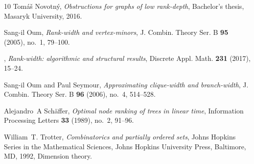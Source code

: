 \documentclass[11pt]{article}
\begin{document}
\begin{thebibliography}{10}
Tom{\'a}{\v{s}} Novotn{\'y}, \emph{Obstructions for graphs of low rank-depth},
  Bachelor’s thesis, Masaryk University, 2016.

Sang{-}il Oum, \emph{Rank-width and vertex-minors}, J. Combin. Theory Ser. B
  \textbf{95} (2005), no.~1, 79--100. 

\bysame, \emph{Rank-width: algorithmic and structural results}, Discrete Appl.
  Math. \textbf{231} (2017), 15--24.

Sang{-}il Oum and Paul Seymour, \emph{Approximating clique-width and
  branch-width}, J. Combin. Theory Ser. B \textbf{96} (2006), no.~4, 514--528.

Alejandro~A Sch{\"a}ffer, \emph{Optimal node ranking of trees in linear time},
  Information Processing Letters \textbf{33} (1989), no.~2, 91--96.

William~T. Trotter, \emph{Combinatorics and partially ordered sets}, Johns
  Hopkins Series in the Mathematical Sciences, Johns Hopkins University Press,
  Baltimore, MD, 1992, Dimension theory. 

\end{thebibliography}
\end{document}
